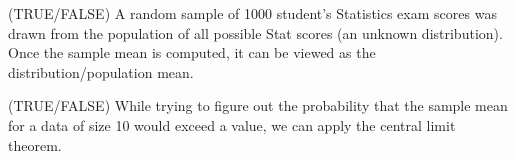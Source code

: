 \documentclass[addpoints]{examsetup}\usepackage[]{graphicx}\usepackage[]{color}
\begin{document}



\examCoverPage

\begin{questions}

\question[2]
(TRUE/FALSE) A random sample of 1000 student's Statistics exam scores was drawn from the population of all possible Stat scores (an unknown distribution).
Once the sample mean is computed, it can be viewed as the distribution/population mean.

\vspace{1cm}

\question[2]
(TRUE/FALSE) While trying to figure out the probability that the sample mean for a data of size 10 would exceed a value, we can apply the central limit theorem.

\vspace{1cm}

%
% 
% 
% 
% 
% 
% 
% 
% 
% 
% 
% 
% 
% 


\end{questions}
\end{document}
